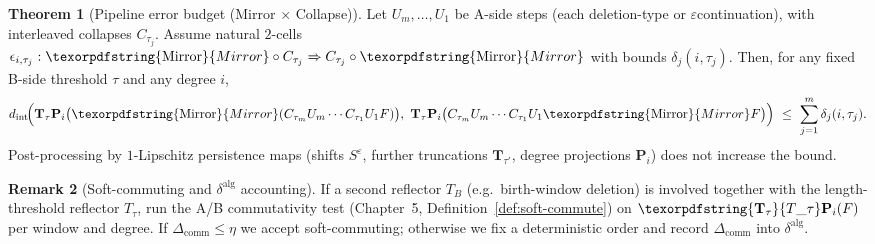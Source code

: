 \documentclass[11pt]{article}
\numberwithin{equation}{section}
\theoremstyle{plain}
\theoremstyle{definition}
\theoremstyle{remark}
\DeclareRobustCommand{\hyp}{\nobreakdash-}
\theoremstyle{plain}
\theoremstyle{definition}
\numberwithin{equation}{section}
\newtheorem{theorem}{Theorem}[section]
\theoremstyle{definition}
\newtheorem{remark}[theorem]{Remark}
\DeclareRobustCommand{\Ttau}{\texorpdfstring{\ensuremath{\mathbf{T}_{\tau}}}{T\_\tau}}
\DeclareRobustCommand{\Mirror}{\texorpdfstring{\ensuremath{\operatorname{Mirror}}}{Mirror}}
\numberwithin{equation}{section}
\theoremstyle{plain}
\theoremstyle{definition}
\theoremstyle{remark}
\providecommand{\Tfun}[1]{\mathbf{T}_{#1}}
\providecommand{\Ttau}{\Tfun{\tau}}
\begin{document}
\begin{theorem}[Pipeline error budget (Mirror $\times$ Collapse)]\label{thm:pipe-budget-8}
Let \(U_m,\dots,U_1\) be A\hyp side steps (each deletion\hyp type or \(\varepsilon\)\nobreakdash continuation), with interleaved collapses \(C_{\tau_j}\).
Assume natural $2$-cells \(\epsilon_{i,\tau_j}:\Mirror\circ C_{\tau_j}\Rightarrow C_{\tau_j}\circ \Mirror\) with bounds \(\delta_j(i,\tau_j)\).
Then, for any fixed B\hyp side threshold \(\tau\) and any degree \(i\),
\[
d_{\mathrm{int}}\!\Big(\mathbf{T}_\tau \mathbf{P}_i\big(\Mirror(C_{\tau_m}U_m\cdots C_{\tau_1}U_1F)\big),\ \mathbf{T}_\tau \mathbf{P}_i\big(C_{\tau_m}U_m\cdots C_{\tau_1}U_1\Mirror F\big)\Big)\ \le\ \sum_{j=1}^m \delta_j(i,\tau_j).
\]
Post\hyp processing by $1$-Lipschitz persistence maps (shifts $S^\varepsilon$, further truncations $\mathbf{T}_{\tau'}$, degree projections $\mathbf{P}_i$) does not increase the bound.
\end{theorem}

\begin{remark}[Soft\hyp commuting and $\delta^{\mathrm{alg}}$ accounting]\label{rk:soft-comm-8}
If a second reflector $T_B$ (e.g.\ birth\hyp window deletion) is involved together with the length\hyp threshold reflector $T_\tau$, run the A/B commutativity test (Chapter~5, Definition~\ref{def:soft-commute}) on \(\Ttau\mathbf{P}_i(F)\) per window and degree.
If \(\Delta_{\mathrm{comm}}\le \eta\) we accept soft\hyp commuting; otherwise we fix a deterministic order and record \(\Delta_{\mathrm{comm}}\) into $\delta^{\mathrm{alg}}$.
\end{remark}
\end{document}
